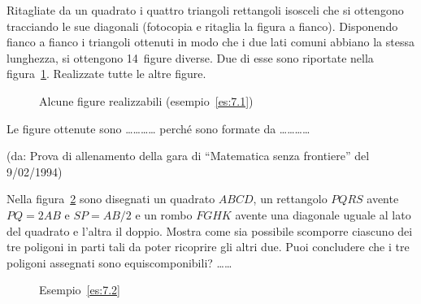 \begin{exrig}
\noindent\begin{minipage}{0.65\textwidth}\parindent15pt
\begin{esempio}\label{es:7.1}
Ritagliate da un quadrato i quattro triangoli rettangoli isosceli che si ottengono tracciando le sue diagonali (fotocopia e ritaglia la figura a fianco). Disponendo fianco a fianco i triangoli ottenuti in modo che i due lati comuni abbiano la stessa lunghezza, si ottengono 14~figure diverse. Due di esse sono riportate nella figura~\ref{fig:quadrato2}. Realizzate tutte le altre figure.
\end{esempio}
\end{minipage}\hfil
\begin{minipage}{0.35\textwidth}
	\centering
\end{minipage}\vspace{5pt}

\begin{figure}[!htb]
\centering
\caption{Alcune figure realizzabili (esempio~\ref{es:7.1})}\label{fig:quadrato2}
\end{figure}

Le figure ottenute sono \ldots\ldots\ldots\ldots{} perché sono formate da \ldots\ldots\ldots\ldots{}

\noindent(da: Prova di allenamento della gara di ``Matematica senza frontiere'' del 9/02/1994)

\begin{esempio}\label{es:7.2}
Nella figura~\ref{fig:figure} sono disegnati un quadrato $ABCD$, un rettangolo $PQRS$ avente $PQ=2AB$ e $SP=AB/2$ e un rombo $FGHK$ avente una diagonale uguale al lato del quadrato e l'altra il doppio. Mostra come sia possibile scomporre ciascuno dei tre poligoni in parti tali da poter ricoprire gli altri due. Puoi concludere che i tre poligoni assegnati sono equiscomponibili? \ldots\ldots{}

\begin{figure}[!htb]
	\centering
	\caption{Esempio~\ref{es:7.2}}\label{fig:figure}
\end{figure}

\end{esempio}


\end{exrig}
